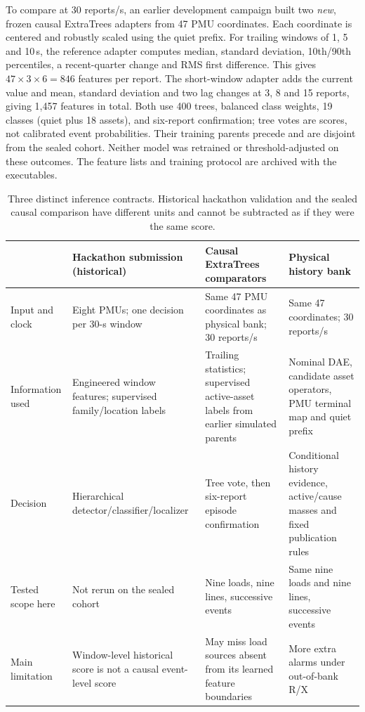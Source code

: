 To compare at 30 reports/s, an earlier development campaign built two
\emph{new}, frozen causal ExtraTrees adapters from 47 PMU coordinates.
Each coordinate is centered and robustly scaled using the quiet prefix.
For trailing windows of 1, 5 and 10\,s, the reference adapter computes
median, standard deviation, 10th/90th percentiles, a recent-quarter
change and RMS first difference. This gives $47\times3\times6=846$
features per report. The short-window adapter adds the current value and
mean, standard deviation and two lag changes at 3, 8 and 15 reports,
giving 1,457 features in total. Both use 400 trees, balanced class weights,
19 classes (quiet plus 18 assets), and six-report confirmation; tree votes
are scores, not calibrated event probabilities. Their training parents
precede and are disjoint from the sealed cohort. Neither model was
retrained or threshold-adjusted on these outcomes. The feature lists and
training protocol are archived with the executables.

\begin{table}[t]\centering\small
\caption{Three distinct inference contracts. Historical hackathon
validation and the sealed causal comparison have different units and
cannot be subtracted as if they were the same score.}
\label{tab:three-contracts}
\renewcommand{\arraystretch}{1.12}
\begin{tabularx}{\textwidth}{@{}p{}>{\raggedright\arraybackslash}X>{\raggedright\arraybackslash}X>{\raggedright\arraybackslash}X@{}}\toprule
 & Hackathon submission (historical) & Causal ExtraTrees comparators & Physical history bank \\\midrule
Input and clock & Eight PMUs; one decision per 30-s window & Same 47 PMU coordinates as physical bank; 30 reports/s & Same 47 coordinates; 30 reports/s \\
Information used & Engineered window features; supervised family/location labels & Trailing statistics; supervised active-asset labels from earlier simulated parents & Nominal DAE, candidate asset operators, PMU terminal map and quiet prefix \\
Decision & Hierarchical detector/classifier/localizer & Tree vote, then six-report episode confirmation & Conditional history evidence, active/cause masses and fixed publication rules \\
Tested scope here & Not rerun on the sealed cohort & Nine loads, nine lines, successive events & Same nine loads and nine lines, successive events \\
Main limitation & Window-level historical score is not a causal event-level score & May miss load sources absent from its learned feature boundaries & More extra alarms under out-of-bank R/X \\\bottomrule
\end{tabularx}\end{table}

